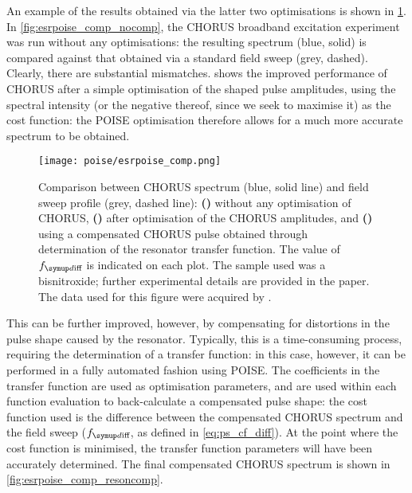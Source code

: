 An example of the results obtained via the latter two optimisations is shown in \cref{fig:esrpoise_comp}.
In \cref{fig:esrpoise_comp_nocomp}, the CHORUS broadband excitation experiment was run without any optimisations: the resulting spectrum (blue, solid) is compared against that obtained via a standard field sweep (grey, dashed).
Clearly, there are substantial mismatches.
 shows the improved performance of CHORUS after a simple optimisation of the shaped pulse amplitudes, using the spectral intensity (or the negative thereof, since we seek to maximise it) as the cost function: the POISE optimisation therefore allows for a much more accurate spectrum to be obtained.

\begin{figure}[htb]
    \centering
    \texttt{[image: poise/esrpoise\_comp.png]}%
    {\label{fig:esrpoise_comp_nocomp}}%
    {\label{fig:esrpoise_comp_ampcomp}}%
    {\label{fig:esrpoise_comp_resoncomp}}%
    \caption[Comparison between CHORUS spectrum and field sweep before and after optimisation]{
        Comparison between CHORUS spectrum (blue, solid line) and field sweep profile (grey, dashed line):
        \textbf{()} without any optimisation of CHORUS,
        \textbf{()} after optimisation of the CHORUS amplitudes, and
        \textbf{()} using a compensated CHORUS pulse obtained through determination of the resonator transfer function.
        The value of $\fdiff$ is indicated on each plot.
        The sample used was a bisnitroxide; further experimental details are provided in the paper.\autocite{Verstraete2022CC}
        The data used for this figure were acquired by \JBV{}.
    }
    \label{fig:esrpoise_comp}
\end{figure}

This can be further improved, however, by compensating for distortions in the pulse shape caused by the resonator.
Typically, this is a time-consuming process, requiring the determination of a transfer function: in this case, however, it can be performed in a fully automated fashion using POISE.
The coefficients in the transfer function are used as optimisation parameters, and are used within each function evaluation to back-calculate a compensated pulse shape: the cost function used is the difference between the compensated CHORUS spectrum and the field sweep ($\fdiff$, as defined in \cref{eq:ps_cf_diff}).
At the point where the cost function is minimised, the transfer function parameters will have been accurately determined.
The final compensated CHORUS spectrum is shown in \cref{fig:esrpoise_comp_resoncomp}.
